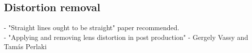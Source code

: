 \subsection{Distortion removal}
- "Straight lines ought to be straight" paper recommended.\\
- "Applying and removing lens distortion in post production" - Gergely Vassy and Tamás Perlaki\\